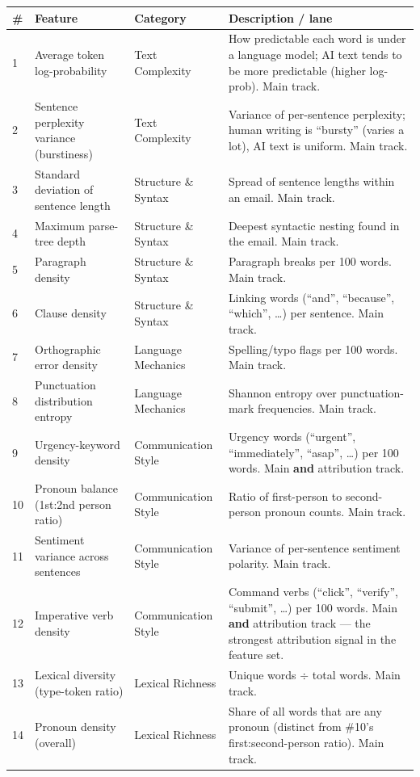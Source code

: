 \documentclass[11pt]{article}
\begin{document}
\renewcommand{\arraystretch}{1.3}
\begin{longtable}{@{}p{0.6cm}p{4.3cm}p{3.6cm}p{6.8cm}@{}}
\toprule
\textbf{\#} & \textbf{Feature} & \textbf{Category} & \textbf{Description / lane} \\
\midrule
\endhead
1 & Average token log-probability & Text Complexity & How predictable each word is under a language model; AI text tends to be more predictable (higher log-prob). Main track. \\
2 & Sentence perplexity variance (burstiness) & Text Complexity & Variance of per-sentence perplexity; human writing is ``bursty'' (varies a lot), AI text is uniform. Main track. \\
3 & Standard deviation of sentence length & Structure \& Syntax & Spread of sentence lengths within an email. Main track. \\
4 & Maximum parse-tree depth & Structure \& Syntax & Deepest syntactic nesting found in the email. Main track. \\
5 & Paragraph density & Structure \& Syntax & Paragraph breaks per 100 words. Main track. \\
6 & Clause density & Structure \& Syntax & Linking words (``and'', ``because'', ``which'', \ldots) per sentence. Main track. \\
7 & Orthographic error density & Language Mechanics & Spelling/typo flags per 100 words. Main track. \\
8 & Punctuation distribution entropy & Language Mechanics & Shannon entropy over punctuation-mark frequencies. Main track. \\
9 & Urgency-keyword density & Communication Style & Urgency words (``urgent'', ``immediately'', ``asap'', \ldots) per 100 words. Main \textbf{and} attribution track. \\
10 & Pronoun balance (1st:2nd person ratio) & Communication Style & Ratio of first-person to second-person pronoun counts. Main track. \\
11 & Sentiment variance across sentences & Communication Style & Variance of per-sentence sentiment polarity. Main track. \\
12 & Imperative verb density & Communication Style & Command verbs (``click'', ``verify'', ``submit'', \ldots) per 100 words. Main \textbf{and} attribution track --- the strongest attribution signal in the feature set. \\
13 & Lexical diversity (type-token ratio) & Lexical Richness & Unique words $\div$ total words. Main track. \\
14 & Pronoun density (overall) & Lexical Richness & Share of all words that are any pronoun (distinct from \#10's first:second-person ratio). Main track. \\
\bottomrule
\end{longtable}
\end{document}

